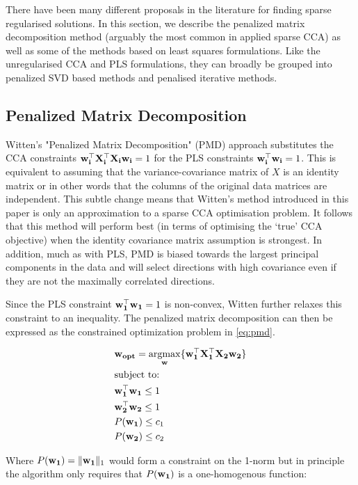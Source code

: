 There have been many different proposals in the literature for finding sparse regularised solutions. In this section, we describe the penalized matrix decomposition method (arguably the most common in applied sparse CCA) as well as some of the methods based on least squares formulations. Like the unregularised CCA and PLS formulations, they can broadly be grouped into penalized SVD based methods and penalised iterative methods.

\subsection{Penalized Matrix Decomposition}\label{sec:witten}

Witten's "Penalized Matrix Decomposition" (PMD) \cite{witten2009penalized} approach substitutes the CCA constraints $\bold{w_i^{\top}X_i^{\top}X_iw_i}=1$ for the PLS constraints $\bold{w_i^{\top}w_i}=1$. This is equivalent to assuming that the variance-covariance matrix of $X$ is an identity matrix or in other words that the columns of the original data matrices are independent. This subtle change means that Witten's method introduced in this paper is only an approximation to a sparse CCA optimisation problem. It follows that this method will perform best (in terms of optimising the `true' CCA objective) when the identity covariance matrix assumption is strongest. In addition, much as with PLS, PMD is biased towards the largest principal components in the data and will select directions with high covariance even if they are not the maximally correlated directions.

Since the PLS constraint $\bold{w_1^{\top}w_1}=1$ is non-convex, Witten further relaxes this constraint to an inequality. The penalized matrix decomposition can then be expressed as the constrained optimization problem in \ref{eq:pmd}.

\begin{align}
    \label{eq:pmd}
    & \bold{w_{opt}}=\underset{\bold{w}}{\mathrm{argmax}}\{ \bold{w_1^{\top}X_1^{\top}X_2w_2} \}\\
    & \text{subject to:} \notag\\
    & \bold{w_1^{\top}w_1}\leq1 \notag\\
    & \bold{w_2^{\top}w_2}\leq1 \notag\\
    & P(\bold{w_1})\leq c_1 \notag\\
    &P(\bold{w_2})\leq c_2 \notag
\end{align}

Where $P(\bold{w_1})=\|\bold{w_1}\|_1$ would form a constraint on the 1-norm but in principle the algorithm only requires that $P(\bold{w_1})$ is a one-homogenous function:

